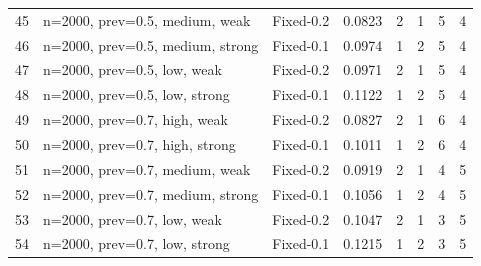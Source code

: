 \begin{tabular}{rlllrrrr}
45 & n=2000, prev=0.5, medium, weak & Fixed-0.2 & 0.0823 & 2 & 1 & 5 & 4 \\
46 & n=2000, prev=0.5, medium, strong & Fixed-0.1 & 0.0974 & 1 & 2 & 5 & 4 \\
47 & n=2000, prev=0.5, low, weak & Fixed-0.2 & 0.0971 & 2 & 1 & 5 & 4 \\
48 & n=2000, prev=0.5, low, strong & Fixed-0.1 & 0.1122 & 1 & 2 & 5 & 4 \\
49 & n=2000, prev=0.7, high, weak & Fixed-0.2 & 0.0827 & 2 & 1 & 6 & 4 \\
50 & n=2000, prev=0.7, high, strong & Fixed-0.1 & 0.1011 & 1 & 2 & 6 & 4 \\
51 & n=2000, prev=0.7, medium, weak & Fixed-0.2 & 0.0919 & 2 & 1 & 4 & 5 \\
52 & n=2000, prev=0.7, medium, strong & Fixed-0.1 & 0.1056 & 1 & 2 & 4 & 5 \\
53 & n=2000, prev=0.7, low, weak & Fixed-0.2 & 0.1047 & 2 & 1 & 3 & 5 \\
54 & n=2000, prev=0.7, low, strong & Fixed-0.1 & 0.1215 & 1 & 2 & 3 & 5 \\
\bottomrule
\end{tabular}
